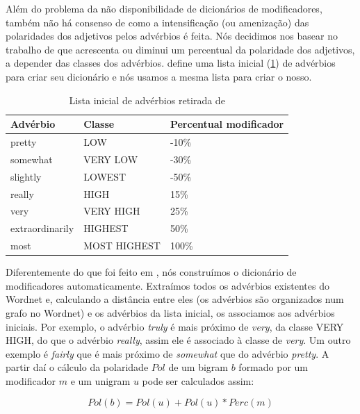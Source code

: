 Além do problema da não disponibilidade de dicionários de modificadores, também não há consenso de como a intensificação (ou amenização) das polaridades dos adjetivos pelos advérbios é feita. Nós decidimos nos basear no trabalho de \cite{taboada2011lexicon} que acrescenta ou diminui um percentual da polaridade dos adjetivos, a depender das classes dos advérbios.  define uma lista inicial (\ref{table:adv_seed}) de advérbios para criar seu dicionário e nós usamos a mesma lista para criar o nosso.

\begin{table}[!h]
	\centering
    \begin{tabular}{lll}
    Advérbio         				& Classe          & Percentual modificador \\ \hline
    pretty                   			& LOW 			   & -10\% \\
    somewhat                   	& VERY LOW  & -30\% \\
    slightly                   		& LOWEST 	   & -50\% \\
    really                   			& HIGH 			   & 15\% \\
    very                   			& VERY HIGH &  25\% \\
    extraordinarily             & HIGHEST 	   & 50\% \\
    most                   			& MOST HIGHEST & 100\% \\
    \end{tabular}
    \caption{Lista inicial de advérbios retirada de \cite{taboada2011lexicon}}
	\label{table:adv_seed}
\end{table}

Diferentemente do que foi feito em , nós construímos o dicionário de modificadores automaticamente. Extraímos todos os advérbios existentes do Wordnet e, calculando a distância entre eles (os advérbios são organizados num grafo no Wordnet) e os advérbios da lista inicial, os associamos aos advérbios iniciais. Por exemplo, o advérbio \textit{truly} é mais próximo de \textit{very}, da classe VERY HIGH, do que o advérbio \textit{really}, assim ele é associado à classe de \textit{very}. Um outro exemplo é \textit{fairly} que é mais próximo de \textit{somewhat} que do advérbio \textit{pretty}. A partir daí o cálculo da polaridade $Pol$ de um bigram $b$ formado por um modificador $m$ e um unigram $u$ pode ser calculados assim: 

\begin{equation}
Pol(b) = Pol(u) + Pol(u) * Perc(m)
\label{eq:pol_bigrams}
\end{equation}

